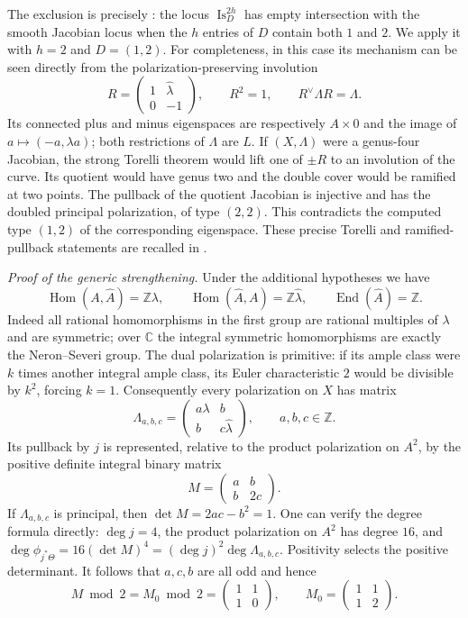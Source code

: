 The exclusion is precisely
\citet[Corollary 2(1), p.~1540, with proof on p.~1541]{frC4Borowka2016}:
the locus $\operatorname{Is}^{2h}_D$ has empty intersection with
the smooth Jacobian locus when the $h$ entries of $D$ contain
both $1$ and $2$. We apply it with $h=2$ and $D=(1,2)$.
For completeness, in this case its mechanism can be seen
directly from the polarization-preserving involution
\[
 R=\begin{pmatrix}1&\widehat\lambda\\0&-1\end{pmatrix},
 \qquad R^2=1,\qquad R^\vee\Lambda R=\Lambda.
\]
Its connected plus and minus eigenspaces are respectively
$A\times0$ and the image of
$a\mapsto(-a,\lambda a)$; both restrictions of $\Lambda$
are $L$. If $(X,\Lambda)$ were a genus-four Jacobian,
the strong Torelli theorem would lift one of $\pm R$ to
an involution of the curve. Its quotient would have genus
two and the double cover would be ramified at two points.
The pullback of the quotient Jacobian is injective and has
the doubled principal polarization, of type $(2,2)$.
This contradicts the computed type $(1,2)$ of the
corresponding eigenspace. These precise Torelli and
ramified-pullback statements are recalled in
\citet[Theorems 5--6, p.~1539]{frC4Borowka2016}.

\emph{Proof of the generic strengthening.}
Under the additional hypotheses we have
\[
 \operatorname{Hom}(A,\widehat A)=\mathbb Z\lambda,
 \qquad
 \operatorname{Hom}(\widehat A,A)=\mathbb Z\widehat\lambda,
 \qquad
 \operatorname{End}(\widehat A)=\mathbb Z.
\]
Indeed all rational homomorphisms in the first group
are rational multiples of $\lambda$ and are symmetric;
over $\mathbb C$ the integral symmetric homomorphisms
are exactly the Neron--Severi group. The dual polarization
is primitive: if its ample class were $k$ times another
integral ample class, its Euler characteristic $2$ would
be divisible by $k^2$, forcing $k=1$.
Consequently every polarization on $X$ has matrix
\[
 \Lambda_{a,b,c}=
 \begin{pmatrix}a\lambda&b\\b&c\widehat\lambda\end{pmatrix},
 \qquad a,b,c\in\mathbb Z.
\]
Its pullback by $j$ is represented, relative to the
product polarization on $A^2$, by the positive definite
integral binary matrix
\[
                M=\begin{pmatrix}a&b\\b&2c\end{pmatrix}.
\]
If $\Lambda_{a,b,c}$ is principal, then
$\det M=2ac-b^2=1$. One can verify the degree formula
directly: $\deg j=4$, the product polarization on $A^2$
has degree $16$, and
$\deg\phi_{j^*\Theta}=16(\det M)^4
 =(\deg j)^2\deg\Lambda_{a,b,c}$.
Positivity selects the positive determinant.
It follows that $a,c,b$ are all odd and hence
\[
                 M\bmod2=
                 M_0\bmod2=
                 \begin{pmatrix}1&1\\1&0\end{pmatrix},
 \qquad M_0=\begin{pmatrix}1&1\\1&2\end{pmatrix}.
\]

